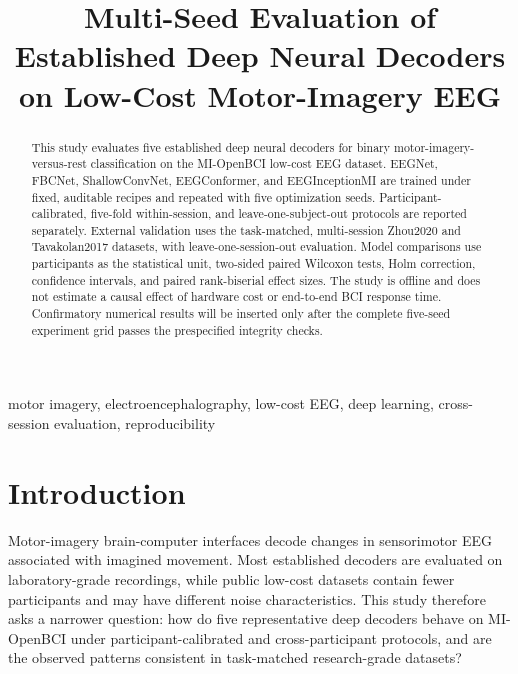 \documentclass[conference]{IEEEtran}
\begin{document}
\title{Multi-Seed Evaluation of Established Deep Neural Decoders on Low-Cost Motor-Imagery EEG}

\author{
}

\maketitle

\begin{abstract}
This study evaluates five established deep neural decoders for binary motor-imagery-versus-rest
classification on the MI-OpenBCI low-cost EEG dataset. EEGNet, FBCNet, ShallowConvNet,
EEGConformer, and EEGInceptionMI are trained under fixed, auditable recipes and repeated with five
optimization seeds. Participant-calibrated, five-fold within-session, and leave-one-subject-out
protocols are reported separately. External validation uses the task-matched, multi-session
Zhou2020 and Tavakolan2017 datasets, with leave-one-session-out evaluation. Model comparisons use
participants as the statistical unit, two-sided paired Wilcoxon tests, Holm correction, confidence
intervals, and paired rank-biserial effect sizes. The study is offline and does not estimate a
causal effect of hardware cost or end-to-end BCI response time. Confirmatory numerical results will
be inserted only after the complete five-seed experiment grid passes the prespecified integrity
checks.
\end{abstract}

\begin{IEEEkeywords}
motor imagery, electroencephalography, low-cost EEG, deep learning, cross-session evaluation,
reproducibility
\end{IEEEkeywords}

\section{Introduction}

Motor-imagery brain-computer interfaces decode changes in sensorimotor EEG associated with
imagined movement. Most established decoders are evaluated on laboratory-grade recordings, while
public low-cost datasets contain fewer participants and may have different noise characteristics.
This study therefore asks a narrower question: how do five representative deep decoders behave on
MI-OpenBCI under participant-calibrated and cross-participant protocols, and are the observed
patterns consistent in task-matched research-grade datasets?
\end{document}
